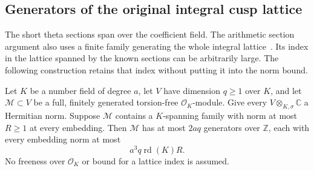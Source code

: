 \subsection{Generators of the original integral cusp lattice}
\label{shared-actual-integral-cusp-frame}

The short theta sections span over the coefficient field.  The
arithmetic section argument also uses a finite family generating the
whole integral lattice~\cite{bergman-integral-frame-source}.
Its index in the lattice spanned by the
known sections can be arbitrarily large.  The following construction
retains that index without putting it into the norm bound.

\begin{lemma}
\label{lem:actual-integral-generator-conversion}
Let $K$ be a number field of degree $a$, let $V$ have dimension
$q\ge1$ over $K$, and let $\mathcal M\subset V$ be a full,
finitely generated torsion-free $\mathcal O_K$-module.  Give every
$V\otimes_{K,\sigma}\mathbb C$ a Hermitian norm.  Suppose
$\mathcal M$ contains a $K$-spanning family with norm at most
$R\ge1$ at every embedding.  Then $\mathcal M$ has at most $2aq$
generators over $\mathbb Z$, each with every embedding norm at most
\begin{equation}\label{eq:actual-integral-generator-bound}
                      a^3q\operatorname{rd}(K)R.
\end{equation}
No freeness over $\mathcal O_K$ or bound for a lattice index is
assumed.
\end{lemma}


